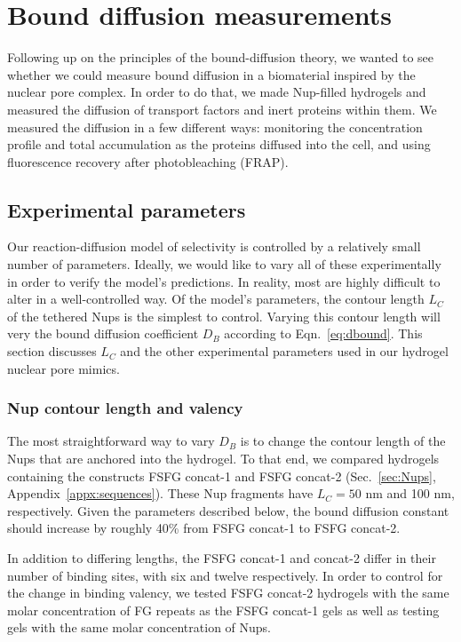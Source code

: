 \chapter{Bound diffusion measurements}\label{ch04}
\label{ch:bound-diffusion}

Following up on the principles of the bound-diffusion theory, we wanted to see whether we could measure bound diffusion in a biomaterial inspired by the nuclear pore complex.  In order to do that, we made Nup-filled hydrogels and measured the diffusion of transport factors and inert proteins within them.  We measured the diffusion in a few different ways: monitoring the concentration profile and total accumulation as the proteins diffused into the cell, and using fluorescence recovery after photobleaching (FRAP).

\section{Experimental parameters}

Our reaction-diffusion model of selectivity is controlled by a relatively small number of parameters.  Ideally, we would like to vary all of these experimentally in order to verify the model's predictions.  In reality, most are highly difficult to alter in a well-controlled way.  Of the model's parameters, the contour length $L_C$ of the tethered Nups is the simplest to control.  Varying this contour length will very the bound diffusion coefficient $D_B$ according to Eqn.~\ref{eq:dbound}.  This section discusses $L_C$ and the other experimental parameters used in our hydrogel nuclear pore mimics.

\subsection{Nup contour length and valency}

The most straightforward way to vary $D_B$ is to change the contour length of the Nups that are anchored into the hydrogel.  To that end, we compared hydrogels containing the constructs FSFG concat-1 and FSFG concat-2 (Sec.~\ref{sec:Nups}, Appendix~\ref{appx:sequences}).  These Nup fragments have $L_C = 50$ nm and 100 nm, respectively.  Given the parameters described below, the bound diffusion constant should increase by roughly 40\% from FSFG concat-1 to FSFG concat-2.

In addition to differing lengths, the FSFG concat-1 and concat-2 differ in their number of binding sites, with six and twelve respectively.  In order to control for the change in binding valency, we tested FSFG concat-2 hydrogels with the same molar concentration of FG repeats as the FSFG concat-1 gels as well as testing gels with the same molar concentration of Nups.


